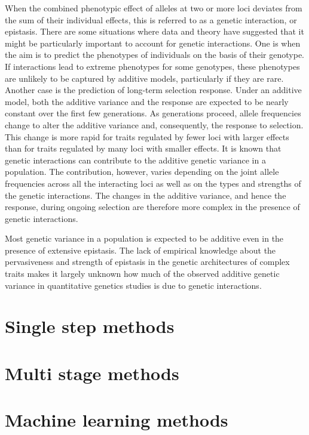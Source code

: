 \documentclass[]{book}
\theoremstyle{definition}
\theoremstyle{definition}
\theoremstyle{definition}
\theoremstyle{remark}
\begin{document}
When the combined phenotypic effect of alleles at two or more loci
deviates from the sum of their individual effects, this is referred to
as a genetic interaction, or epistasis. There are some situations where
data and theory have suggested that it might be particularly important
to account for genetic interactions. One is when the aim is to predict
the phenotypes of individuals on the basis of their genotype. If
interactions lead to extreme phenotypes for some genotypes, these
phenotypes are unlikely to be captured by additive models, particularly
if they are rare. Another case is the prediction of long-term selection
response. Under an additive model, both the additive variance and the
response are expected to be nearly constant over the first few
generations. As generations proceed, allele frequencies change to alter
the additive variance and, consequently, the response to selection. This
change is more rapid for traits regulated by fewer loci with larger
effects than for traits regulated by many loci with smaller effects. It
is known that genetic interactions can contribute to the additive
genetic variance in a population. The contribution, however, varies
depending on the joint allele frequencies across all the interacting
loci as well as on the types and strengths of the genetic interactions.
The changes in the additive variance, and hence the response, during
ongoing selection are therefore more complex in the presence of genetic
interactions.

Most genetic variance in a population is expected to be additive even in
the presence of extensive epistasis. The lack of empirical knowledge
about the pervasiveness and strength of epistasis in the genetic
architectures of complex traits makes it largely unknown how much of the
observed additive genetic variance in quantitative genetics studies is
due to genetic interactions.

\section{Single step methods}\label{single-step-methods-1}

\section{Multi stage methods}\label{multi-stage-methods-1}

\section{Machine learning methods}\label{machine-learning-methods-1}
\end{document}
